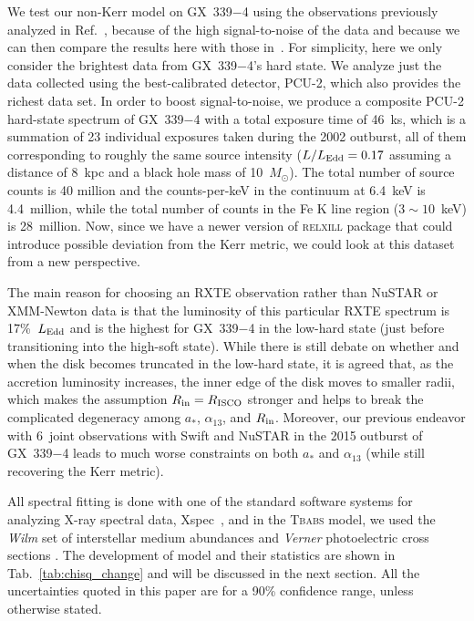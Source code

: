 \documentclass[11pt,a4paper,pdftex]{article}
\begin{document}
We test our non-Kerr model on GX~339$-$4 using the observations previously analyzed in Ref.~\cite{javier_gx339}, because of the high signal-to-noise of the data and because we can then compare the results here with those in~\cite{javier_gx339}. For simplicity, here we only consider the brightest data from GX~339$-$4's hard state. We analyze just the data collected using the best-calibrated detector, PCU-2, which also provides the richest data set. In order to boost signal-to-noise, we produce a composite PCU-2 hard-state spectrum of GX~339$-$4 with a total exposure time of 46~ks, which is a summation of 23 individual exposures taken during the 2002 outburst, all of them corresponding to roughly the same source intensity ($L/L_{\rm Edd} = 0.17$ assuming a distance of 8~kpc and a black hole mass of 10~$M_\odot$). The total number of source counts is 40 million and the counts-per-keV in the continuum at 6.4~keV is 4.4~million, while the total number of counts in the Fe K line region ($3\sim10$~keV) is 28~million. Now, since we have a newer version of \textsc{relxill} package that could introduce possible deviation from the Kerr metric, we could look at this dataset from a new perspective.


The main reason for choosing an RXTE observation rather than NuSTAR or XMM-Newton data is that the luminosity of this particular RXTE spectrum is 17\%~$L_{\rm Edd}$ and is the highest for GX~339$-$4 in the low-hard state (just before transitioning into the high-soft state). While there is still debate on whether and when the disk becomes truncated in the low-hard state, it is agreed that, as the accretion luminosity increases, the inner edge of the disk moves to smaller radii, which makes the assumption $R_{\rm in}=R_{\rm ISCO}$ stronger and helps to break the complicated degeneracy among $a_*$, $\alpha_{13}$, and $R_{\rm in}$. Moreover, our previous endeavor with 6~joint observations with Swift and NuSTAR in the 2015 outburst of GX~339$-$4 leads to much worse constraints on both $a_*$ and $\alpha_{13}$ (while still recovering the Kerr metric).


All spectral fitting is done with one of the standard software systems for analyzing X-ray spectral data, {\sc Xspec}~\cite{arnaud}, and in the \textsc{Tbabs} model, we used the \textit{Wilm} set of interstellar medium abundances \cite{wilms2000absorption} and \textit{Verner} photoelectric cross sections \cite{a3}. The development of model and their statistics are shown in Tab.~\ref{tab:chisq_change} and will be discussed in the next section. All the uncertainties quoted in this paper are for a 90\% confidence range, unless otherwise stated.
\end{document}
